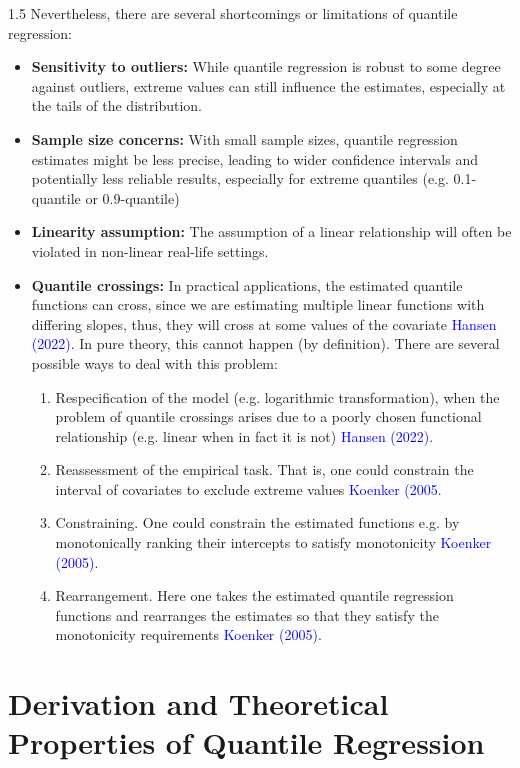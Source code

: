\documentclass[conference]{IEEEtran}
\begin{document}
\begin{spacing}{1.5}
Nevertheless, there are several shortcomings or limitations of quantile regression:
\begin{itemize}
\item \textbf{Sensitivity to outliers:} While quantile regression is robust to some degree against outliers, extreme values can still influence the estimates, especially at the tails of the distribution.
\item \textbf{Sample size concerns:} With small sample sizes, quantile regression estimates might be less precise, leading to wider confidence intervals and potentially less reliable results, especially for extreme quantiles (e.g. 0.1-quantile or 0.9-quantile)
\item \textbf{Linearity assumption:} The assumption of a linear relationship will often be violated in non-linear real-life settings.
\item \textbf{Quantile crossings:} In practical applications, the estimated quantile functions can cross, since we are estimating multiple linear functions with differing slopes, thus, they will cross at some values of the covariate  \textcolor{blue}{Hansen (2022)}. In pure theory, this cannot happen (by definition). There are several possible ways to deal with this problem:
\begin{enumerate}
\item Respecification of the model (e.g. logarithmic transformation), when the problem of quantile crossings arises due to a poorly chosen functional relationship (e.g. linear when in fact it is not)  \textcolor{blue}{Hansen (2022)}.
\item Reassessment of the empirical task. That is, one could constrain the interval of covariates to exclude extreme values  \textcolor{blue}{Koenker (2005}.
\item Constraining. One could constrain the estimated functions e.g. by monotonically ranking their intercepts to satisfy monotonicity  \textcolor{blue}{Koenker (2005)}.
\item Rearrangement. Here one takes the estimated quantile regression functions and rearranges the estimates so that they satisfy the monotonicity requirements \textcolor{blue}{Koenker (2005)}.
\end{enumerate}

\end{itemize}

\section{\textbf{Derivation and Theoretical Properties of Quantile Regression}}


\end{spacing}
\end{document}
